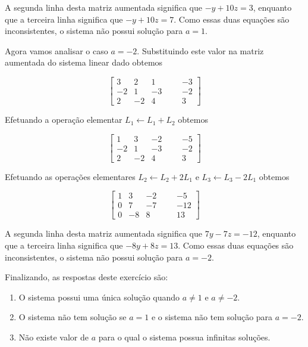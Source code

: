 \begin{solution}
A segunda linha desta matriz aumentada significa que $-y+10z=3$, enquanto que a terceira linha significa que $-y+10z=7$.
Como essas duas equações são inconsistentes, o sistema não possui solução para $a=1$.

\medskip
Agora vamos analisar o caso $a=-2$. Substituindo este valor na matriz aumentada do sistema linear dado obtemos

$$ \left[\begin{array}{rrrr|rr}
  3 &    2 &    1 & & &   -3  \\
 -2 &    1 &   -3 & & &   -2  \\ 
  2 &   -2 &    4 & & &    3  \end{array}\right] $$

Efetuando a operação elementar $L_1 \leftarrow L_1 + L_2$ obtemos

$$ \left[\begin{array}{rrrr|rr}
  1 &    3 &   -2 & & &   -5  \\
 -2 &    1 &   -3 & & &   -2  \\ 
  2 &   -2 &    4 & & &    3  \end{array}\right] $$

Efetuando as operações elementares $L_2 \leftarrow L_2 + 2L_1$ e $L_3 \leftarrow L_3 - 2L_1$ obtemos

$$ \left[\begin{array}{rrrr|rr}
  1 &    3 &   -2 & & &   -5  \\
  0 &    7 &   -7 & & &  -12  \\ 
  0 &   -8 &    8 & & &   13  \end{array}\right] $$

A segunda linha desta matriz aumentada significa que $7y-7z=-12$, enquanto que a terceira linha significa que $-8y+8z=13$.
Como essas duas equações são inconsistentes, o sistema não possui solução para $a=-2$.

\medskip
Finalizando, as respostas deste exercício são:
\begin{enumerate}
\item[(a)] O sistema possui uma única solução quando $a \neq 1$ e $a \neq -2$.
\item[(b)] O sistema não tem solução se $a=1$ e o sistema não tem solução para $a=-2$.
\item[(c)] Não existe valor de $a$ para o qual o sistema possua infinitas soluções.
\end{enumerate}
\end{solution}

